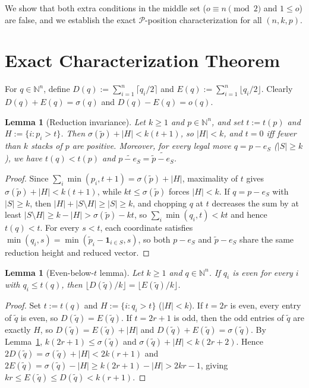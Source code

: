 \documentclass[11pt]{article}
\newtheorem{lemma}[theorem]{Lemma}
\begin{document}
We show that both extra conditions in the middle set ($o \equiv n \pmod 2$ and
$1 \le o$) are false, and we establish the exact $\mathcal{P}$-position
characterization for all $(n, k, p)$.

\section{Exact Characterization Theorem}

For $q \in \mathbb{N}^n$, define
$D(q) := \sum_{i=1}^n \lceil q_i / 2 \rceil$ and
$E(q) := \sum_{i=1}^n \lfloor q_i / 2 \rfloor$. Clearly
$D(q) + E(q) = \sigma(q)$ and $D(q) - E(q) = o(q)$.

\begin{lemma}[Reduction invariance]\label{lem:red}
Let $k \ge 1$ and $p \in \mathbb{N}^n$, and set $t := t(p)$ and
$H := \{i : p_i > t\}$. Then $\sigma(\tilde p) + |H| < k(t + 1)$, so $|H| < k$,
and $t = 0$ iff fewer than $k$ stacks of $p$ are positive. Moreover, for every
legal move $q = p - e_S$ ($|S| \ge k$), we have $t(q) < t(p)$ and
$\widetilde{p - e_S} = \widetilde{\tilde p - e_S}$.
\end{lemma}

\begin{proof}
Since $\sum_i \min(p_i, t + 1) = \sigma(\tilde p) + |H|$, maximality of $t$
gives $\sigma(\tilde p) + |H| < k(t + 1)$, while $k t \le \sigma(\tilde p)$
forces $|H| < k$. If $q = p - e_S$ with $|S| \ge k$, then
$|H| + |S \setminus H| \ge |S| \ge k$, and chopping $q$ at $t$ decreases the
sum by at least $|S \setminus H| \ge k - |H| > \sigma(\tilde p) - k t$, so
$\sum_i \min(q_i, t) < k t$ and hence $t(q) < t$. For every $s < t$, each
coordinate satisfies $\min(q_i, s) = \min(\tilde p_i - \mathbf{1}_{i \in S}, s)$,
so both $p - e_S$ and $\tilde p - e_S$ share the same reduction height and
reduced vector.
\end{proof}

\begin{lemma}[Even-below-$t$ lemma]\label{lem:even}
Let $k \ge 1$ and $q \in \mathbb{N}^n$. If $q_i$ is even for every $i$ with
$q_i \le t(q)$, then $\lfloor D(\tilde q)/k \rfloor = \lfloor E(\tilde q)/k \rfloor$.
\end{lemma}

\begin{proof}
Set $t := t(q)$ and $H := \{i : q_i > t\}$ ($|H| < k$). If $t = 2r$ is even,
every entry of $\tilde q$ is even, so $D(\tilde q) = E(\tilde q)$. If
$t = 2r + 1$ is odd, then the odd entries of $\tilde q$ are exactly $H$, so
$D(\tilde q) = E(\tilde q) + |H|$ and $D(\tilde q) + E(\tilde q) = \sigma(\tilde q)$.
By Lemma~\ref{lem:red}, $k(2r + 1) \le \sigma(\tilde q)$ and
$\sigma(\tilde q) + |H| < k(2r + 2)$. Hence
$2 D(\tilde q) = \sigma(\tilde q) + |H| < 2k(r + 1)$ and
$2 E(\tilde q) = \sigma(\tilde q) - |H| \ge k(2r + 1) - |H| > 2k r - 1$,
giving $k r \le E(\tilde q) \le D(\tilde q) < k(r + 1)$.
\end{proof}
\end{document}
